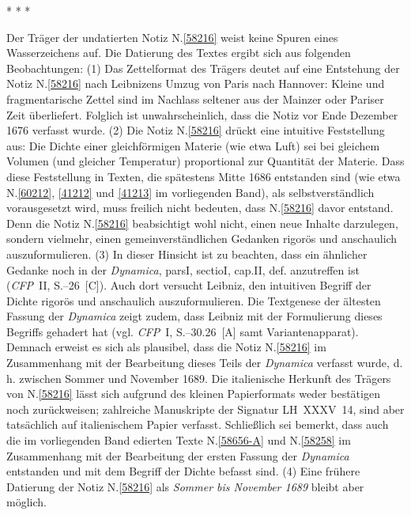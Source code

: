 \vspace{4.25em}%
\pstart%
\noindent%
\centering%
*     *     *
\pend%
\vspace{3.75em}%
%
\begin{ledgroup}%
\footnotesize%
\pstart%
\noindent%
%
Der Träger der undatierten Notiz N.\;\ref{58216} weist keine Spuren eines Wasserzeichens auf.
Die Datierung des Textes ergibt sich aus folgenden Beobachtungen:
\pend%
\pstart%
(1)
Das Zettelformat des Trägers deutet auf eine Entstehung der Notiz N.\;\ref{58216} nach Leibnizens Umzug von Paris nach Hannover:
Kleine und fragmentarische Zettel sind im Nachlass seltener aus der Mainzer oder Pariser Zeit überliefert.
Folglich ist unwahrscheinlich, dass die Notiz vor Ende Dezember 1676 verfasst wurde.
\pend%
\pstart%
(2)
Die Notiz N.\;\ref{58216} drückt eine intuitive Feststellung aus:
Die Dichte einer gleichförmigen Materie (wie etwa Luft) sei bei gleichem Volumen (und gleicher Temperatur) proportional zur Quantität der Materie.
Dass diese Feststellung in Texten, die spätestens Mitte 1686 entstanden sind (wie etwa N.\;\ref{60212}, \ref{41212} und \ref{41213} im vorliegenden Band), als selbstverständlich vorausgesetzt wird, muss freilich nicht bedeuten, dass N.\;\ref{58216} davor entstand.
Denn die Notiz N.\;\ref{58216} beabsichtigt wohl nicht, einen neue Inhalte darzulegen, sondern vielmehr, einen gemeinverständlichen Gedanken rigorös und anschaulich auszuformulieren.
\pend%
\pstart%
(3)
In dieser Hinsicht ist zu beachten, dass ein ähnlicher Gedanke %
noch in der \textit{Dynamica}, pars\;I, sectio\;I, cap.\;II, def.\cite{01354} anzutreffen ist (\textit{CFP}~II, S.--26~[C]). %
Auch dort versucht Leibniz, den intuitiven Begriff der Dichte rigorös und anschaulich auszuformulieren.
Die Textgenese der ältesten Fassung der \textit{Dynamica} zeigt zudem, dass Leibniz mit der Formulierung dieses Begriffs gehadert hat (vgl. \textit{CFP}~I, S.--30.26~[A] samt Variantenapparat).
Demnach erweist es sich als plausibel, dass die Notiz N.\;\ref{58216} im Zusammenhang mit der Bearbeitung dieses Teils der \textit{Dynamica}\cite{01354} verfasst wurde, d.\,h. zwischen Sommer und November 1689.
Die italienische Herkunft des Trägers von N.\;\ref{58216} lässt sich aufgrund des kleinen Papierformats weder bestätigen noch zurückweisen;
zahlreiche Manuskripte der Signatur LH~XXXV~14, sind aber tatsächlich auf italienischem Papier verfasst.
Schließlich sei bemerkt, dass auch die im vorliegenden Band edierten Texte N.\;\ref{58656-A} und N.\;\ref{58258} im Zusammenhang mit der Bearbeitung der ersten Fassung der \textit{Dynamica}\cite{01354} entstanden und mit dem Begriff der Dichte befasst sind.
\pend%
\pstart%
(4)
Eine frühere Datierung der Notiz N.\;\ref{58216} als \textit{Sommer bis November 1689} bleibt aber möglich.%
\pend%
\end{ledgroup}%
\normalsize%
%
\frenchspacing%
